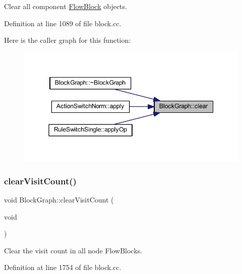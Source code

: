 Clear all component \mbox{\hyperlink{class_flow_block}{Flow\+Block}} objects. 



Definition at line 1089 of file block.\+cc.

Here is the caller graph for this function\+:
\nopagebreak
\begin{figure}[H]
\begin{center}
\leavevmode
\includegraphics[width=345pt]{class_block_graph_a1220886c0c0cad9c8f482afe53dba5d4_icgraph}
\end{center}
\end{figure}
\mbox{\label{class_block_graph_ad5a3ac8db8d8d2e4fc0ddc1c6b1dab0d}} 
\subsubsection{\texorpdfstring{clearVisitCount()}{clearVisitCount()}}
{\footnotesize\ttfamily void Block\+Graph\+::clear\+Visit\+Count (\begin{DoxyParamCaption}\item[{void}]{ }\end{DoxyParamCaption})}



Clear the visit count in all node Flow\+Blocks. 



Definition at line 1754 of file block.\+cc.

